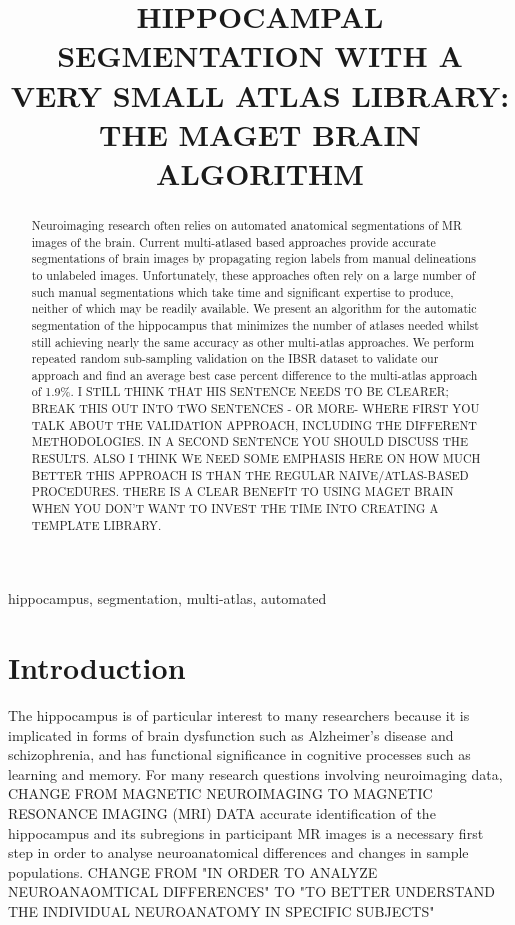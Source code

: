 \documentclass{article}
\title{HIPPOCAMPAL SEGMENTATION WITH A VERY SMALL ATLAS LIBRARY: THE MAGET
BRAIN ALGORITHM}
\begin{document}

\maketitle       

\begin{abstract}
Neuroimaging research often relies on automated anatomical
segmentations of MR images of the brain. Current multi-atlased based
approaches provide accurate segmentations of brain images by
propagating region labels from manual delineations to unlabeled
images.  Unfortunately, these approaches often rely on a large number
of such manual segmentations which take time and significant expertise
to produce, neither of which may be readily available.  We present
an algorithm for the automatic segmentation of the hippocampus that
minimizes the number of atlases needed whilst still achieving nearly
the same accuracy as other multi-atlas approaches.  We perform
repeated random sub-sampling validation on the IBSR dataset to
validate our approach and find an average best case percent difference
to the multi-atlas approach of 1.9\%. {I STILL THINK THAT HIS SENTENCE NEEDS TO BE CLEARER; BREAK THIS OUT INTO TWO SENTENCES - OR MORE- WHERE FIRST YOU TALK ABOUT THE VALIDATION APPROACH, INCLUDING THE DIFFERENT METHODOLOGIES.  IN A SECOND SENTENCE YOU SHOULD DISCUSS THE RESULTS.  ALSO I THINK WE NEED SOME EMPHASIS HERE ON HOW MUCH BETTER THIS APPROACH IS THAN THE REGULAR NAIVE/ATLAS-BASED PROCEDURES.  THERE IS A CLEAR BENEFIT TO USING MAGET BRAIN WHEN YOU DON'T WANT TO INVEST THE TIME INTO CREATING A TEMPLATE LIBRARY.}

\end{abstract}

\begin{keywords}
hippocampus, segmentation, multi-atlas, automated
\end{keywords}

\section{Introduction}
\label{sec:intro}

The hippocampus is of particular interest to many researchers because it is
implicated in forms of brain dysfunction such as Alzheimer's disease and
schizophrenia, and has functional significance in cognitive processes such as
learning and memory.  For many research questions involving neuroimaging
data, {CHANGE FROM MAGNETIC NEUROIMAGING TO MAGNETIC RESONANCE IMAGING
(MRI) DATA}
accurate identification of the hippocampus and its subregions in participant MR
images is a necessary first step in order to analyse neuroanatomical
differences and changes in sample populations.  {CHANGE FROM "IN ORDER TO
ANALYZE NEUROANAOMTICAL DIFFERENCES" TO "TO BETTER UNDERSTAND THE
INDIVIDUAL NEUROANATOMY IN SPECIFIC SUBJECTS"}
\end{document}
